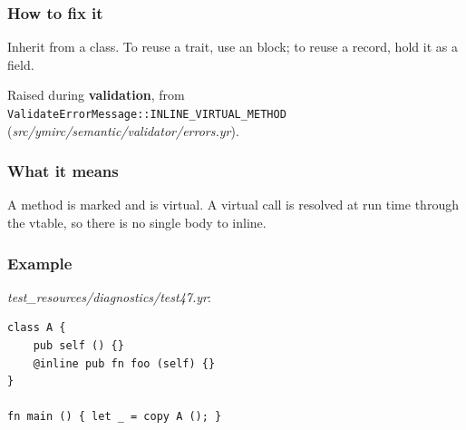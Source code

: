\subsubsection*{How to fix it}

Inherit from a class. To reuse a trait, use an  block; to reuse a record, hold it as a field.

\label{sec:codes:e4103}

Raised during \textbf{validation}, from \texttt{ValidateErrorMessage::\allowbreak{}INLINE\_\allowbreak{}VIRTUAL\_\allowbreak{}METHOD} (\textit{src/\allowbreak{}ymirc/\allowbreak{}semantic/\allowbreak{}validator/\allowbreak{}errors.yr}).

\subsubsection*{What it means}

A method is marked  and is virtual. A virtual call is resolved at run time through the vtable, so there is no single body to inline.

\subsubsection*{Example}

\textit{test\_\allowbreak{}resources/\allowbreak{}diagnostics/\allowbreak{}test47.yr}:

\begin{lstlisting}[style=coloredverbatimError]
class A {
    pub self () {}
    @inline pub fn foo (self) {}
}

fn main () { let _ = copy A (); }
\end{lstlisting}

